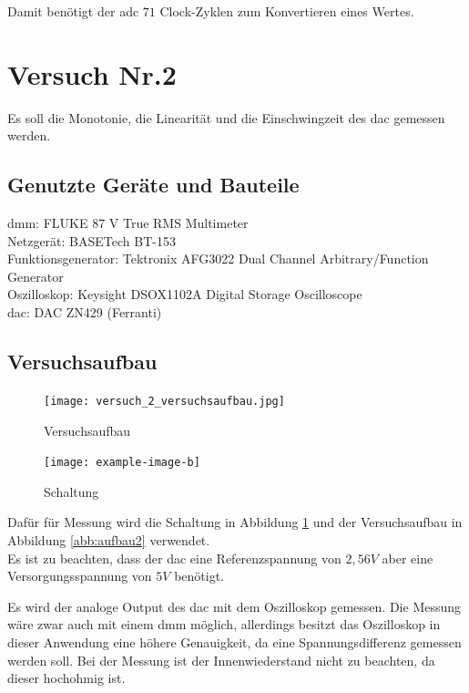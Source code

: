 \documentclass[12pt, a4paper, ngerman]{article}
\begin{document}
Damit benötigt der \ac{adc} $71$ Clock-Zyklen zum Konvertieren eines Wertes.


\section{Versuch Nr.2}

Es soll die Monotonie, die Linearität und die Einschwingzeit des \ac{dac} gemessen werden.

\subsection{Genutzte Geräte und Bauteile}

\acl{dmm}: FLUKE 87 V True RMS Multimeter \\
Netzgerät: BASETech BT-153 \\
Funktionsgenerator: Tektronix AFG3022 Dual Channel Arbitrary/Function Generator \\
Oszilloskop: Keysight DSOX1102A Digital Storage Oscilloscope \\
\ac{dac}: DAC ZN429 (Ferranti)

\subsection{Versuchsaufbau}


\begin{figure}%
  \centering
  \begin{minipage}[b]{0.49\textwidth}
    \texttt{[image: versuch\_2\_versuchsaufbau.jpg]}
    \caption{Versuchsaufbau}
    \label{abb:aufbau2}
  \end{minipage}
  \hfill
  \begin{minipage}[b]{0.49\textwidth}
    \texttt{[image: example-image-b]}
    \caption{Schaltung}
    \label{abb:schaltung2}
  \end{minipage}
\end{figure}

Dafür für Messung wird die Schaltung in Abbildung \ref{abb:schaltung2}
und der Versuchsaufbau in Abbildung \ref{abb:aufbau2} verwendet. \\
Es ist zu beachten, dass der \ac{dac} eine Referenzspannung von $2,56V$
aber eine Versorgungsspannung von $5V$ benötigt.

Es wird der analoge Output des \ac{dac} mit dem Oszilloskop gemessen.
Die Messung wäre zwar auch mit einem \ac{dmm} möglich,
allerdings besitzt das Oszilloskop in dieser Anwendung eine höhere Genauigkeit, da eine Spannungsdifferenz gemessen werden soll.
Bei der Messung ist der Innenwiederstand nicht zu beachten, da dieser hochohmig ist.
\end{document}
